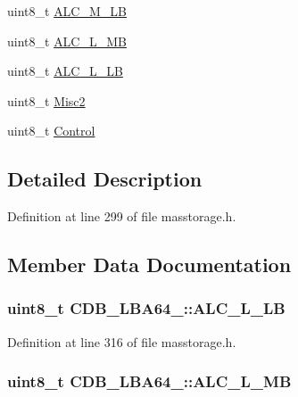 \begin{DoxyCompactItemize}
\item 
uint8\-\_\-t \hyperlink{struct_c_d_b___l_b_a64__16_a61acd48736824f7a82f23e3dd52a3233}{\-A\-L\-C\-\_\-\-M\-\_\-\-L\-B}
\item 
uint8\-\_\-t \hyperlink{struct_c_d_b___l_b_a64__16_accc008fb29aef96d80833c81b1ab6a7b}{\-A\-L\-C\-\_\-\-L\-\_\-\-M\-B}
\item 
uint8\-\_\-t \hyperlink{struct_c_d_b___l_b_a64__16_a1b0f65bbe0956d6e4c99d00339fadfec}{\-A\-L\-C\-\_\-\-L\-\_\-\-L\-B}
\item 
uint8\-\_\-t \hyperlink{struct_c_d_b___l_b_a64__16_a9a71353cc6ecb838dfd560a3c985e4a6}{\-Misc2}
\item 
uint8\-\_\-t \hyperlink{struct_c_d_b___l_b_a64__16_ad40f82369182a1001877c7f8d818c418}{\-Control}
\end{DoxyCompactItemize}


\subsection{\-Detailed \-Description}


\-Definition at line 299 of file masstorage.\-h.



\subsection{\-Member \-Data \-Documentation}
\hypertarget{struct_c_d_b___l_b_a64__16_a1b0f65bbe0956d6e4c99d00339fadfec}{
\subsubsection[{\-A\-L\-C\-\_\-\-L\-\_\-\-L\-B}]{\setlength{\rightskip}{0pt plus 5cm}uint8\-\_\-t {\bf \-C\-D\-B\-\_\-\-L\-B\-A64\-\_\-::\-A\-L\-C\-\_\-\-L\-\_\-\-L\-B}}}\label{struct_c_d_b___l_b_a64__16_a1b0f65bbe0956d6e4c99d00339fadfec}


\-Definition at line 316 of file masstorage.\-h.

\hypertarget{struct_c_d_b___l_b_a64__16_accc008fb29aef96d80833c81b1ab6a7b}{
\subsubsection[{\-A\-L\-C\-\_\-\-L\-\_\-\-M\-B}]{\setlength{\rightskip}{0pt plus 5cm}uint8\-\_\-t {\bf \-C\-D\-B\-\_\-\-L\-B\-A64\-\_\-::\-A\-L\-C\-\_\-\-L\-\_\-\-M\-B}}}\label{struct_c_d_b___l_b_a64__16_accc008fb29aef96d80833c81b1ab6a7b}


